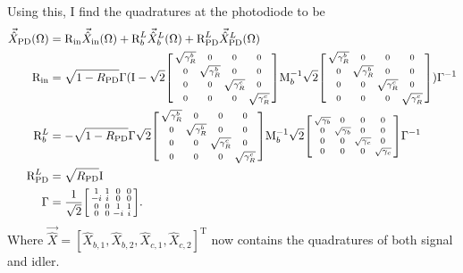 Using this, I find the quadratures at the photodiode to be
\begin{align}
\vec{\hat X}_\mathrm{PD}(\Omega)&=\text{R}_\text{in}\vec{\hat X}_\mathrm{in}(\Omega)+\text{R}^L_b\vec{\hat X}^L_b(\Omega)+\text{R}^L_\text{PD}\vec{\hat X}^L_\text{PD}(\Omega)\\
\text{R}_\text{in}&=\sqrt{1-R_\text{PD}}\Gamma(\text{I}-\sqrt 2\begin{bsmallmatrix}
\sqrt{\gamma^b_R} & 0 & 0 & 0 \\
0 & \sqrt{\gamma^b_R} & 0 & 0 \\
0 & 0 & \sqrt{\gamma^c_R} & 0 \\
0 & 0 & 0 & \sqrt{\gamma^c_R}
\end{bsmallmatrix}\text{M}_b^{-1}\sqrt{2}\begin{bsmallmatrix}
\sqrt{\gamma^b_R} & 0 & 0 & 0 \\
0 & \sqrt{\gamma^b_R} & 0 & 0 \\
0 & 0 & \sqrt{\gamma^c_R} & 0 \\
0 & 0 & 0 & \sqrt{\gamma^c_R}
\end{bsmallmatrix})\Gamma^{-1}\\
\text{R}^L_b&=-\sqrt{1-R_\text{PD}}\Gamma\sqrt 2\begin{bsmallmatrix}
\sqrt{\gamma^b_R} & 0 & 0 & 0 \\
0 & \sqrt{\gamma^b_R} & 0 & 0 \\
0 & 0 & \sqrt{\gamma^c_R} & 0 \\
0 & 0 & 0 & \sqrt{\gamma^c_R}
\end{bsmallmatrix}\text{M}_b^{-1}\sqrt{2}\begin{bsmallmatrix}
\sqrt{\gamma_b} & 0 & 0 & 0 \\
0 & \sqrt{\gamma_b} & 0 & 0 \\
0 & 0 & \sqrt{\gamma_c} & 0 \\
0 & 0 & 0 & \sqrt{\gamma_c}
\end{bsmallmatrix}\Gamma^{-1}\\
\text{R}^L_\text{PD}&=\sqrt{R_\text{PD}} \text{I}\\
\Gamma&= \frac{1}{\sqrt2}\begin{bsmallmatrix}
1 & 1 & 0 & 0 \\
-i & i & 0 & 0 \\
0 & 0 & 1 & 1 \\
0 & 0 & -i & i
\end{bsmallmatrix}.
\end{align}
Where $\vec{\hat X}=[\hat X_{b,1},\hat X_{b,2},\hat X_{c,1},\hat X_{c,2}]^\text{T}$ now contains the quadratures of both signal and idler.

